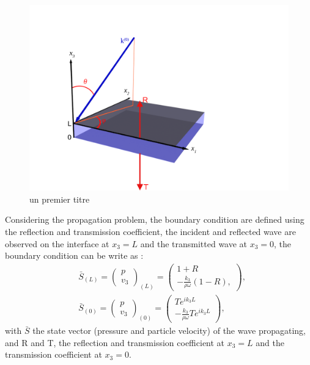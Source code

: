 \documentclass{article}
\begin{document}
    \begin{figure}[h!]
        \centering
        \includegraphics[scale=0.6]{Fig3D.png}
        \caption{un premier titre}
        \label{Schema_PB}
    \end{figure}
    
    Considering the propagation problem, the boundary condition are defined using the reflection and transmission coefficient, the incident and reflected wave are observed on the interface at $x_3=L$ and the transmitted wave at $x_3=0$, the boundary condition can be write as :
     \begin{align}
    &\bar{S}_{(L)}=\begin{pmatrix}
    	p \\ v_3
    \end{pmatrix}_{(L)}=\begin{pmatrix}
    					    1+R \\ -\frac{k_3}{\rho \omega}(1-R),
    					\end{pmatrix},\label{BC_L} \\
  	&\bar{S}_{(0)}=\begin{pmatrix}
    	p \\ v_3
    \end{pmatrix}_{(0)}=\begin{pmatrix}
    						Te^{ik_3L} \\ -\frac{k_3}{\rho \omega}Te^{ik_3L}
    					\end{pmatrix},\label{BC_0}
    \end{align}                         
    with $\bar{S}$ the state vector (pressure and particle velocity) of the wave propagating, and R and T, the reflection and transmission coefficient at $x_3=L$ and the transmission coefficient at $x_3=0$.  
    
\end{document}
